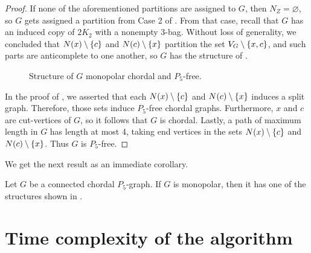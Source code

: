 \begin{proof}
    If none of the aforementioned partitions are assigned to $G$, then
    $N_Z=\varnothing$, so $G$ gets assigned a partition from Case 2 of
    . From that case, recall that $G$ has an induced
    copy of $2K_2$ with a nonempty 3-bag. Without loss of generality, we
    concluded that $N(x)\setminus \left\{c\right\}$ and $N(c) \setminus \left\{x\right\}$ partition
    the set $V_G\setminus \left\{x,c\right\}$, and such parts are anticomplete to one
    another, so $G$ has the structure of .

    \begin{figure}[htb!]
        \centering
        \caption{Structure of $G$ monopolar chordal and $P_5$-free.}
        \label{fig:chordal_structure_4}
    \end{figure}

    In the proof of , we asserted that each
    $N(x)\setminus \left\{c\right\}$ and $N(c)\setminus \left\{x\right\}$ induces a split graph.
    Therefore, those sets induce $P_5$-free chordal graphs. Furthermore, $x$ and
    $c$ are cut-vertices of $G$, so it follows that $G$ is chordal. Lastly, a
    path of maximum length in $G$ has length at most 4, taking end vertices in
    the sets $N(x)\setminus \left\{c\right\}$ and $N(c)\setminus \left\{x\right\}$. Thus $G$ is
    $P_5$-free.

\end{proof}

We get the next result as an immediate corollary.

\begin{corollary}
    Let $G$ be a connected chordal $P_5$-graph.   If $G$ is monopolar, then it
    has one of the structures shown in
    .
\end{corollary}

\section{Time complexity of the algorithm}

